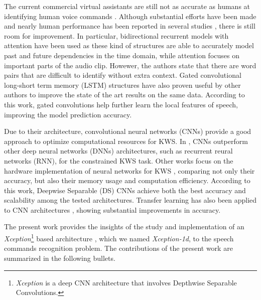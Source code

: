 The current commercial virtual assistants are still not as accurate as humans at identifying human voice commands \cite{Michaely2017}. Although substantial efforts have been made and nearly human performance has been reported in several studies \cite{Andrade2018, Zhang2017, McMahan2018, Warden2018}, there is still room for improvement. In particular, bidirectional recurrent models with attention have been used  \cite{Andrade2018} as these kind of structures are able to accurately model past and future dependencies in the time domain, while attention focuses on important parts of the audio clip. Howewer, the authors state that there are word pairs that are difficult to identify without extra context. Gated convolutional long-short term memory (LSTM) structures have also proven useful by other authors \cite{Wang2018} to improve the state of the art results on the same data. According to this work, gated convolutions help further learn the local features of speech, improving the model prediction accuracy.

Due to their architecture, convolutional neural networks (CNNs) provide a good approach to optimize computational resources for KWS. In \cite{Tara2015}, CNNs outperform other deep neural networks (DNNs) architectures, such as recurrent reural networks (RNN), for the constrained KWS task. Other works focus on the hardware implementation of neural networks for KWS \cite{Zhang2017}, comparing not only their accuracy, but also their memory usage and computation efficiency. According to this work, Deepwise Separable (DS) CNNs achieve both the best accuracy and scalability among the tested architectures.  Transfer learning has also been applied to CNN architectures \cite{McMahan2018}, showing substantial improvements in accuracy.

The present work provides the insights of the study and implementation of an \textit{Xception}\footnote{\textit{Xception} is a deep CNN architecture that involves Depthwise Separable Convolutions.} based architecture \cite{FChollet2017}, which we named \textit{Xception-1d}, to the speech commands recognition problem.  The contributions of the present work are summarized in the following bullets.
 
